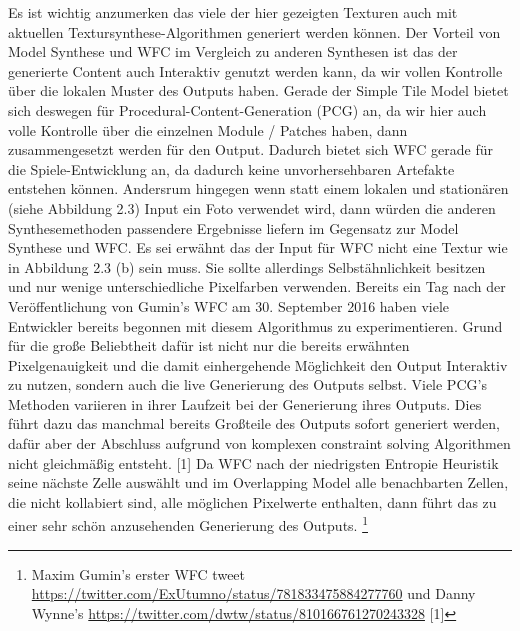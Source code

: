 \documentclass[12pt]{report}
\begin{document}
Es ist wichtig anzumerken das viele der hier gezeigten Texturen auch mit aktuellen Textursynthese-Algorithmen generiert werden können.
Der Vorteil von Model Synthese und WFC im Vergleich zu anderen Synthesen ist das der generierte Content auch Interaktiv genutzt werden kann,
da wir vollen Kontrolle über die lokalen Muster des Outputs haben.
Gerade der Simple Tile Model bietet sich deswegen für Procedural-Content-Generation {(PCG)} an, da wir hier auch volle Kontrolle über die einzelnen Module / Patches haben,
dann zusammengesetzt werden für den Output.
Dadurch bietet sich WFC gerade für die Spiele-Entwicklung an, da dadurch keine unvorhersehbaren Artefakte entstehen können.
Andersrum hingegen wenn statt einem lokalen und stationären {(siehe Abbildung 2.3)} Input ein Foto verwendet wird,
dann würden die anderen Synthesemethoden passendere Ergebnisse liefern im Gegensatz zur Model Synthese und WFC.
Es sei erwähnt das der Input für WFC nicht  eine Textur wie in Abbildung 2.3 {(b)} sein muss.
Sie sollte allerdings Selbstähnlichkeit besitzen und nur wenige unterschiedliche Pixelfarben verwenden.
\newline
Bereits ein Tag nach der Veröffentlichung von Gumin's WFC am 30. September 2016 haben viele Entwickler bereits begonnen mit diesem Algorithmus zu experimentieren.
Grund für die große Beliebtheit dafür ist nicht nur die bereits erwähnten Pixelgenauigkeit und die damit einhergehende Möglichkeit den Output Interaktiv zu nutzen,
sondern auch die live Generierung des Outputs selbst.
Viele PCG's Methoden variieren in ihrer Laufzeit bei der Generierung ihres Outputs.
Dies führt dazu das manchmal bereits Großteile des Outputs sofort generiert werden,
dafür aber der Abschluss aufgrund von komplexen constraint solving Algorithmen nicht gleichmäßig entsteht. {[1]}
Da WFC nach der niedrigsten Entropie Heuristik seine nächste Zelle auswählt und im Overlapping Model alle benachbarten Zellen, die nicht kollabiert sind,
alle möglichen Pixelwerte enthalten, dann führt das zu einer sehr schön anzusehenden Generierung des Outputs.
\footnote[3]{Maxim Gumin’s erster WFC tweet 
\newline
\url{https://twitter.com/ExUtumno/status/781833475884277760}
\newline
und Danny Wynne’s 
\newline
\url{https://twitter.com/dwtw/status/810166761270243328} [1]}
\end{document}
